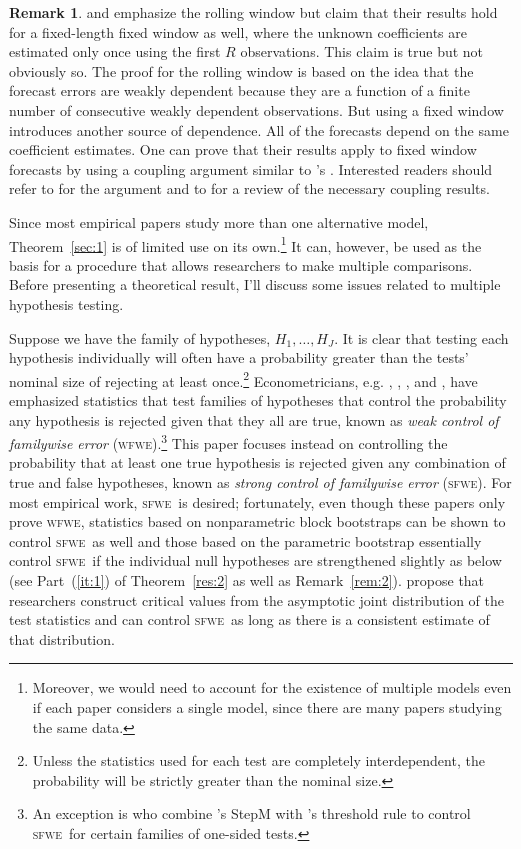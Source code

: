 \documentclass[12pt,fleqn]{article}
\newcommand\citepos[2][]{\citeauthor{#2}'s \citeyearpar[#1]{#2}}
\theoremstyle{definition}
\newtheorem{rem}{Remark}
\newcommand{\sfwe}{\textsc{sfwe}}
\newcommand{\wfwe}{\textsc{wfwe}}
\begin{document}
\begin{rem}
  \citet{GiW:06} and \citet{ClW:06,ClW:07} emphasize the rolling
  window but claim that their results hold for a fixed-length fixed
  window as well, where the unknown coefficients are estimated only
  once using the first $R$ observations.  This claim is true but not
  obviously so.  The proof for the rolling window is based on the idea
  that the forecast errors are weakly dependent because they are a
  function of a finite number of consecutive weakly dependent
  observations.  But using a fixed window introduces another source of
  dependence.  All of the forecasts depend on the same coefficient
  estimates.  One can prove that their results apply to fixed window
  forecasts by using a coupling argument similar to \citepos{Cal:11}.
  Interested readers should refer to \citet{Cal:11} for the argument
  and to \citet{MeP:02} for a review of the necessary coupling
  results.
\end{rem}

Since most empirical papers study more than one alternative model,
Theorem~\ref{sec:1} is of limited use on its own.\footnote{Moreover,
  we would need to account for the existence of multiple models even if
each paper considers a single model, since there are many papers
studying the same data.}  It can, however, be
used as the basis for a procedure that allows researchers to make
multiple comparisons.  Before presenting a theoretical result, I'll
discuss some issues related to multiple hypothesis testing.

Suppose we have the family of hypotheses, $H_1,\dots,H_J$.  It is
clear that testing each hypothesis individually will often have a
probability greater than the tests' nominal size of rejecting at least
once.\footnote{Unless the statistics used for each test are completely
  interdependent, the probability will be strictly greater than the
  nominal size.}  Econometricians, e.g. \citet{Whi:00},
\citet{Han:05}, \cite{HuW:10}, and \citet{ClM:11}, have emphasized
statistics that test families of hypotheses that control the
probability any hypothesis is rejected given that they all are true,
known as \textit{weak control of familywise error}
(\wfwe).\footnote{An exception is \citet{HHK:10} who combine
  \citepos{RoW:05} StepM with \citepos{Han:05} threshold rule to
  control \sfwe\ for certain families of one-sided tests.}  This paper
focuses instead on controlling the probability that at least one true
hypothesis is rejected given any combination of true and false
hypotheses, known as \textit{strong control of familywise error}
(\sfwe).  For most empirical work, \sfwe\ is desired; fortunately,
even though these papers only prove \wfwe, statistics based on
nonparametric block bootstraps \citep{Whi:00,Han:05} can be shown to
control \sfwe\ as well \citep[this follows directly from][]{RoW:05}
and those based on the parametric bootstrap \citep{ClM:11} essentially
control \sfwe\ if the individual null hypotheses are strengthened
slightly as below (see Part~(\ref{it:1}) of Theorem~\ref{res:2} as
well as Remark~\ref{rem:2}).  \citet{HuW:10} propose that researchers
construct critical values from the asymptotic joint distribution of
the test statistics and can control \sfwe\ as long as there is a
consistent estimate of that distribution.
\end{document}
